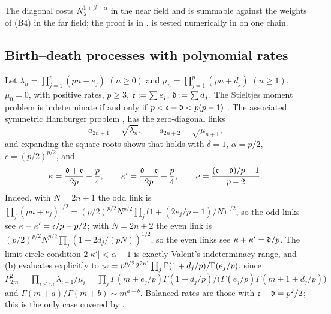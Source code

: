\noindent The diagonal costs $N_\lambda^{1+\beta-\alpha}$ in the near field and is summable against the
weights of (B4) in the far field; the proof is in .  is
tested numerically in  on one chain.

\subsection{Birth--death processes with polynomial rates}\label{sec:bd}

Let $\lambda_n=\prod_{j=1}^p(pn+e_j)$ $(n\ge0)$ and $\mu_n=\prod_{j=1}^p(pn+d_j)$ $(n\ge1)$,
$\mu_0=0$, with positive rates, $p\ge3$, $\mathfrak e:=\sum e_j$, $\mathfrak d:=\sum d_j$. The Stieltjes
moment problem is indeterminate if and only if $p<\mathfrak e-\mathfrak d<p(p-1)$ \cite{Valent1999,BergSzwarc2017}.
The associated symmetric Hamburger problem \cite{Chihara1982},
\cite[Prop.~3.2]{BergSzwarc2017} has the zero-diagonal links
\[
  a_{2n+1}=\sqrt{\lambda_n},\qquad a_{2n+2}=\sqrt{\mu_{n+1}},
\]
and expanding the square roots shows that  holds with $\delta=1$,
$\alpha=p/2$, $c=(p/2)^{p/2}$, and
\[
  \kappa=\frac{\mathfrak d+\mathfrak e}{2p}-\frac p4,\qquad \kappa'=\frac{\mathfrak d-\mathfrak e}{2p}+\frac p4,\qquad
  \nu=\frac{(\mathfrak e-\mathfrak d)/p-1}{p-2} .
\]
Indeed, with $N=2n+1$ the odd link is
$\prod_j(pn+e_j)^{1/2}=(p/2)^{p/2}N^{p/2}\prod_j\bigl(1+(2e_j/p-1)/N\bigr)^{1/2}$, so the odd links see
$\kappa-\kappa'=\mathfrak e/p-p/2$; with $N=2n+2$ the even link is
$(p/2)^{p/2}N^{p/2}\prod_j(1+2d_j/(pN))^{1/2}$, so the even links see $\kappa+\kappa'=\mathfrak d/p$.
The limit-circle condition $2|\kappa'|<\alpha-1$ is exactly Valent's indeterminacy range,
and (b) evaluates explicitly to
$\varpi=p^{p/2}2^{2\kappa'}\prod_j\Gamma(1+d_j/p)/\Gamma(e_j/p)$, since
$P_{2m}^2=\prod_{i\le m}\lambda_{i-1}/\mu_i=\prod_j\Gamma(m+e_j/p)\Gamma(1+d_j/p)/\bigl(\Gamma(e_j/p)\Gamma(m+1+d_j/p)\bigr)$
and $\Gamma(m+a)/\Gamma(m+b)\sim m^{a-b}$. Balanced rates are
those with $\mathfrak e-\mathfrak d=p^2/2$; this is the only case covered by .

